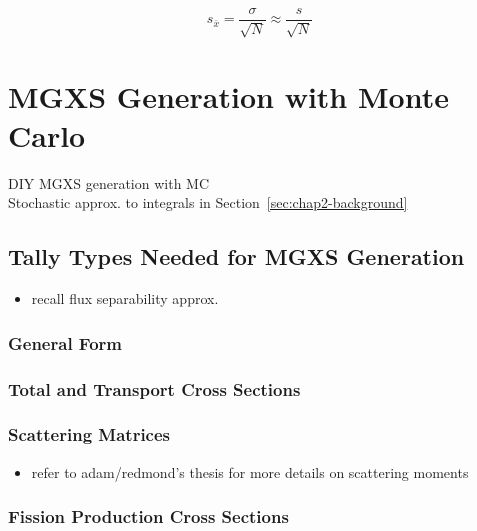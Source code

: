 \begin{dmath}
\label{eqn:chap3-conv-rate}
s_{\bar{x}} = \frac{\sigma}{\sqrt{N}} \approx \frac{s}{\sqrt{N}}
\end{dmath}


\section{\ac{MGXS} Generation with Monte Carlo}
\label{sec:chap3-mgxs-gen}

DIY \ac{MGXS} generation with \ac{MC} \\
Stochastic approx. to integrals in Section~\ref{sec:chap2-background} \\


\subsection{Tally Types Needed for \ac{MGXS} Generation}
\label{subsec:chap3-tally-types}

\begin{itemize}[noitemsep]
  \item recall flux separability approx.
\end{itemize}

\subsubsection{General Form}
\label{subsubsec:chap3-gen-xs}

\subsubsection{Total and Transport Cross Sections}
\label{subsubsec:chap3-tot-xs}

\subsubsection{Scattering Matrices}
\label{subsubsec:chap3-scatt-mat}

\begin{itemize}[noitemsep]
  \item refer to adam/redmond's thesis for more details on scattering moments
\end{itemize}

\subsubsection{Fission Production Cross Sections}
\label{subsubsec:chap3-fiss-prod}

